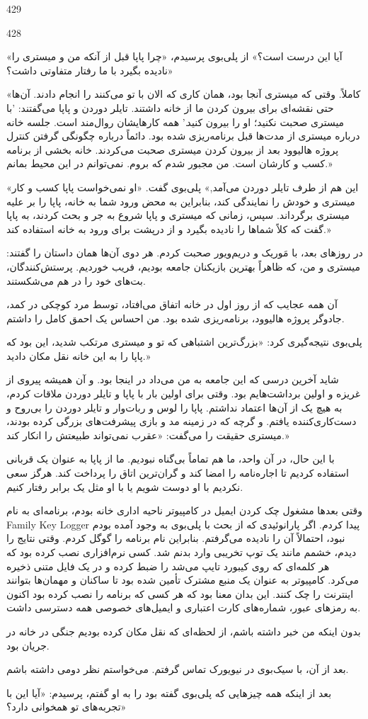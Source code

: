 429

428

«آیا این درست است؟» از پلی‌بوی پرسیدم، «چرا پاپا قبل از آنکه من و میستری را نادیده بگیرد با ما رفتار متفاوتی داشت؟» 

«کاملاً. وقتی که میستری آنجا بود، همان کاری که الان با تو می‌کنند را انجام دادند. آن‌ها حتی نقشه‌ای برای بیرون کردن ما از خانه داشتند. تایلر دوردن و پاپا می‌گفتند: 'با میستری صحبت نکنید؛ او را بیرون کنید.' همه کارهایشان روال‌مند است. جلسه خانه درباره میستری از مدت‌ها قبل برنامه‌ریزی شده بود. دائماً درباره چگونگی گرفتن کنترل پروژه هالیوود بعد از بیرون کردن میستری صحبت می‌کردند. خانه بخشی از برنامه کسب و کارشان است. من مجبور شدم که بروم. نمی‌توانم در این محیط بمانم.»

«این هم از طرف تایلر دوردن می‌آمد,» پلی‌بوی گفت. «او نمی‌خواست پاپا کسب و کار میستری و خودش را نمایندگی کند، بنابراین به محض ورود شما به خانه، پاپا را بر علیه میستری برگرداند. سپس، زمانی که میستری و پاپا شروع به جر و بحث کردند، به پاپا گفت که کلاً شماها را نادیده بگیرد و از درپشت برای ورود به خانه استفاده کند.» 

در روزهای بعد، با مَوریک و دریم‌ویور صحبت کردم. هر دوی آن‌ها همان داستان را گفتند: میستری و من، که ظاهراً بهترین بازیکنان جامعه بودیم، فریب خوردیم. پرستش‌کنندگان، بت‌های خود را در هم می‌شکستند. 

آن همه عجایب که از روز اول در خانه اتفاق می‌افتاد، توسط مرد کوچکی در کمد، جادوگر پروژه هالیوود، برنامه‌ریزی شده بود. من احساس یک احمق کامل را داشتم. 

پلی‌بوی نتیجه‌گیری کرد: «بزرگ‌ترین اشتباهی که تو و میستری مرتکب شدید، این بود که پاپا را به این خانه نقل مکان دادید.»

شاید آخرین درسی که این جامعه به من می‌داد در اینجا بود. و آن همیشه پیروی از غریزه و اولین برداشت‌هایم بود. وقتی برای اولین بار با پاپا و تایلر دوردن ملاقات کردم، به هیچ یک از آن‌ها اعتماد نداشتم. پاپا را لوس و ربات‌وار و تایلر دوردن را بی‌روح و دست‌کاری‌کننده یافتم. و گرچه که در زمینه مد و بازی پیشرفت‌های بزرگی کرده بودند، میستری حقیقت را می‌گفت: «عقرب نمی‌تواند طبیعتش را انکار کند.»

با این حال، در آن واحد، ما هم تماماً بی‌گناه نبودیم. ما از پاپا به عنوان یک قربانی استفاده کردیم تا اجاره‌نامه را امضا کند و گران‌ترین اتاق را پرداخت کند. هرگز سعی نکردیم با او دوست شویم یا با او مثل یک برابر رفتار کنیم.

وقتی بعدها مشغول چک کردن ایمیل در کامپیوتر ناحیه اداری خانه بودم، برنامه‌ای به نام Family Key Logger پیدا کردم. اگر پارانوئیدی که از بحث با پلی‌بوی به وجود آمده بودم نبود، احتمالاً آن را نادیده می‌گرفتم. بنابراین نام برنامه را گوگل کردم. وقتی نتایج را دیدم، خشمم مانند یک توپ تخریبی وارد بدنم شد. کسی نرم‌افزاری نصب کرده بود که هر کلمه‌ای که روی کیبورد تایپ می‌شد را ضبط کرده و در یک فایل متنی ذخیره می‌کرد. کامپیوتر به عنوان یک منبع مشترک تأمین شده بود تا ساکنان و مهمان‌ها بتوانند اینترنت را چک کنند. این بدان معنا بود که هر کسی که برنامه را نصب کرده بود اکنون به رمزهای عبور، شماره‌های کارت اعتباری و ایمیل‌های خصوصی همه دسترسی داشت.

بدون اینکه من خبر داشته باشم، از لحظه‌ای که نقل مکان کرده بودیم جنگی در خانه در جریان بود.

بعد از آن، با سیک‌بوی در نیویورک تماس گرفتم. می‌خواستم نظر دومی داشته باشم.

بعد از اینکه همه چیزهایی که پلی‌بوی گفته بود را به او گفتم، پرسیدم: «آیا این با تجربه‌های تو همخوانی دارد؟»